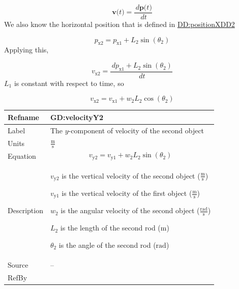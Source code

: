 \documentclass[12pt]{article}
\begin{document}
\begin{displaymath}
\symbf{v}\text{(}t\text{)}=\frac{\,d\symbf{p}\text{(}t\text{)}}{\,dt}
\end{displaymath}
We also know the horizontal position that is defined in \hyperref[DD:positionXDD2]{DD:positionXDD2}

\begin{displaymath}
{p_{\text{x}2}}={p_{\text{x}1}}+{L_{2}} \sin\left({θ_{2}}\right)
\end{displaymath}
Applying this,

\begin{displaymath}
{v_{\text{x}2}}=\frac{\,d{p_{\text{x}1}}+{L_{2}} \sin\left({θ_{2}}\right)}{\,dt}
\end{displaymath}
${L_{1}}$ is constant with respect to time, so

\begin{displaymath}
{v_{\text{x}2}}={v_{\text{x}1}}+{w_{2}} {L_{2}} \cos\left({θ_{2}}\right)
\end{displaymath}
\vspace{\baselineskip}
\noindent
\begin{minipage}{\textwidth}
\begin{tabular}{>{\raggedright}p{}>{\raggedright\arraybackslash}p{}}
\toprule \textbf{Refname} & \textbf{GD:velocityY2}
\label{GD:velocityY2}
\\ \midrule
Label & The $y$-component of velocity of the second object
        
\\ \midrule
Units & $\frac{\text{m}}{\text{s}}$
        
\\ \midrule
Equation & \begin{displaymath}
           {v_{\text{y}2}}={v_{\text{y}1}}+{w_{2}} {L_{2}} \sin\left({θ_{2}}\right)
           \end{displaymath}
\\ \midrule
Description & \begin{symbDescription}
              \item{${v_{\text{y}2}}$ is the vertical velocity of the second object ($\frac{\text{m}}{\text{s}}$)}
              \item{${v_{\text{y}1}}$ is the vertical velocity of the first object ($\frac{\text{m}}{\text{s}}$)}
              \item{${w_{2}}$ is the angular velocity of the second object ($\frac{\text{rad}}{\text{s}}$)}
              \item{${L_{2}}$ is the length of the second rod (${\text{m}}$)}
              \item{${θ_{2}}$ is the angle of the second rod (${\text{rad}}$)}
              \end{symbDescription}
\\ \midrule
Source & --
         
\\ \midrule
RefBy & 
\\ \bottomrule
\end{tabular}
\end{minipage}
\end{document}
